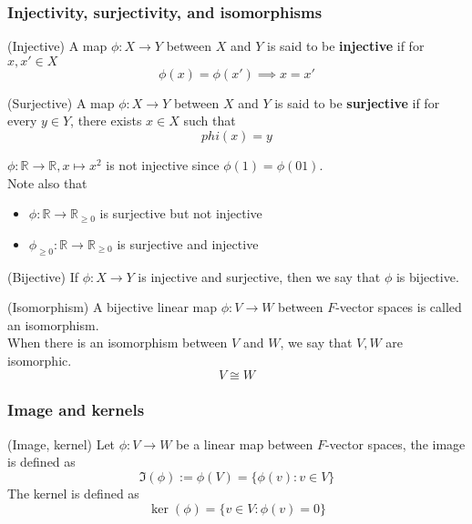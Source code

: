 \subsubsection{Injectivity, surjectivity, and isomorphisms}
\begin{definition}
    (Injective) A map $\phi: X \to Y$ between $X$ and $Y$ is said to be \textbf{injective} if for $x, x' \in X$
    \[
        \phi(x) = \phi(x') \implies x = x'
    \]
\end{definition}

\begin{definition}
    (Surjective) A map $\phi: X \to Y$ between $X$ and $Y$ is said to be \textbf{surjective}  if for every $y \in Y$, there exists $x \in X$ such that 
    \[
    phi(x) = y
    \]
\end{definition}

\begin{example}
    $\phi: \mathbb{R} \to \mathbb{R}, x \mapsto x^2$ is not injective since $\phi(1)= \phi(01)$. \\

    Note also that 
    \begin{itemize}
        \item $\phi: \mathbb{R} \to \mathbb{R}_{\geq 0}$ is surjective but not injective
        \item $\phi_{\geq 0}: \mathbb{R} \to \mathbb{R}_{\geq 0}$ is surjective and injective
    \end{itemize} 
\end{example}

\begin{definition}
    (Bijective) If $\phi: X \to Y$ is injective and surjective, then we say that $\phi$ is bijective.
\end{definition}

\begin{definition}
    (Isomorphism) A bijective linear map $\phi: V \to W$ between $F$-vector spaces is called an isomorphism. \\

    When there is an isomorphism between $V$ and $W$, we say that $V, W$ are isomorphic. 
    \[
        V \cong W
    \]
\end{definition}

\subsubsection{Image and kernels}
\begin{definition}
    (Image, kernel) Let $\phi: V \to W$ be a linear map between $F$-vector spaces, the image is defined as 
    \[
    \Im(\phi) := \phi(V) = \{ \phi(v) : v \in V \} 
    \]
    The kernel is defined as 
    \[
        \ker(\phi) = \{ v \in V: \phi(v) = 0 \} 
    \]
\end{definition}


